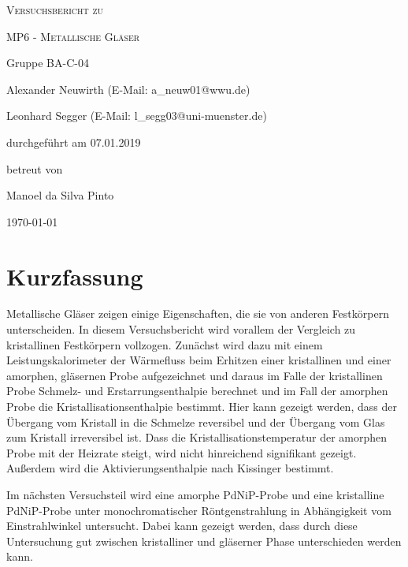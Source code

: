 \documentclass[
	a4paper,
	12pt,
	pagesize,
	ngerman
]{scrartcl}
\begin{document}
	\begin{titlepage}
		\centering
		{\scshape\LARGE Versuchsbericht zu \par}
		\vspace{1cm}
		{\scshape\huge MP6 - Metallische Gläser \par}
		\vspace{2.5cm}
		{\LARGE Gruppe BA-C-04 \par}
		\vspace{0.5cm}

		{\large Alexander Neuwirth (E-Mail: a\_neuw01@wwu.de) \par}
		{\large Leonhard Segger (E-Mail: l\_segg03@uni-muenster.de) \par}
		\vfill

		durchgeführt am 07.01.2019\par
		betreut von\par
		{\large Manoel da Silva Pinto}

		\vfill

		{\large \today\par}
	\end{titlepage}
	\tableofcontents
	\newpage

	\section{Kurzfassung}
	Metallische Gläser zeigen einige Eigenschaften, die sie von anderen Festkörpern unterscheiden.
	In diesem Versuchsbericht wird vorallem der Vergleich zu kristallinen Festkörpern vollzogen.
	Zunächst wird dazu mit einem Leistungskalorimeter der Wärmefluss beim Erhitzen einer kristallinen und einer amorphen, gläsernen Probe aufgezeichnet und daraus im Falle der kristallinen Probe Schmelz- und Erstarrungsenthalpie berechnet und im Fall der amorphen Probe die Kristallisationsenthalpie bestimmt.
	Hier kann gezeigt werden, dass der Übergang vom Kristall in die Schmelze reversibel und der Übergang vom Glas zum Kristall irreversibel ist.
	Dass die Kristallisationstemperatur der amorphen Probe mit der Heizrate steigt, wird nicht hinreichend signifikant gezeigt.
	Außerdem wird die Aktivierungsenthalpie nach Kissinger bestimmt.

	Im nächsten Versuchsteil wird eine amorphe PdNiP-Probe und eine kristalline PdNiP-Probe unter monochromatischer Röntgenstrahlung in Abhängigkeit vom Einstrahlwinkel untersucht.
	Dabei kann gezeigt werden, dass durch diese Untersuchung gut zwischen kristalliner und gläserner Phase unterschieden werden kann.
\end{document}
